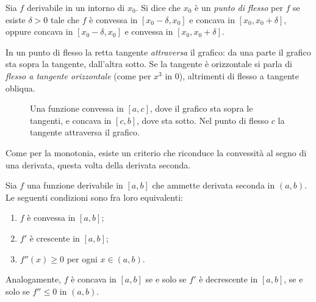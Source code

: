 \begin{definizione}\label{def:flesso}
Sia $f$ derivabile in un intorno di $x_{0}$. Si dice che $x_{0}$ è un \emph{punto di
flesso} per $f$ se esiste $\delta>0$ tale che $f$ è convessa in $[x_{0}-\delta,x_{0}]$ e
concava in $[x_{0},x_{0}+\delta]$, oppure concava in $[x_{0}-\delta,x_{0}]$ e convessa in
$[x_{0},x_{0}+\delta]$.
\end{definizione}

In un punto di flesso la retta tangente \emph{attraversa} il grafico: da una parte il
grafico sta sopra la tangente, dall'altra sotto. Se la tangente è orizzontale si parla
di \emph{flesso a tangente orizzontale} (come per $x^{3}$ in $0$), altrimenti di flesso a
tangente obliqua.

\begin{figure}[htb]
\centering
{}
\caption{Una funzione convessa in $[a,c]$, dove il grafico sta sopra le tangenti, e
concava in $[c,b]$, dove sta sotto. Nel punto di flesso $c$ la tangente attraversa il
grafico.}
\label{fig:convessa-concava}
\end{figure}

Come per la monotonia, esiste un criterio che riconduce la convessità al segno di una
derivata, questa volta della derivata seconda.

\begin{teorema}\label{teo:criterio-convessita}
Sia $f$ una funzione derivabile in $[a,b]$ che ammette derivata seconda in $(a,b)$. Le
seguenti condizioni sono fra loro equivalenti:
\begin{enumerate}[label=\textup{(\alph*)}]
  \item $f$ è convessa in $[a,b]$;
  \item $f'$ è crescente in $[a,b]$;
  \item $f''(x)\ge0$ per ogni $x\in(a,b)$.
\end{enumerate}
Analogamente, $f$ è concava in $[a,b]$ se e solo se $f'$ è decrescente in $[a,b]$, se e
solo se $f''\le0$ in $(a,b)$.
\end{teorema}

